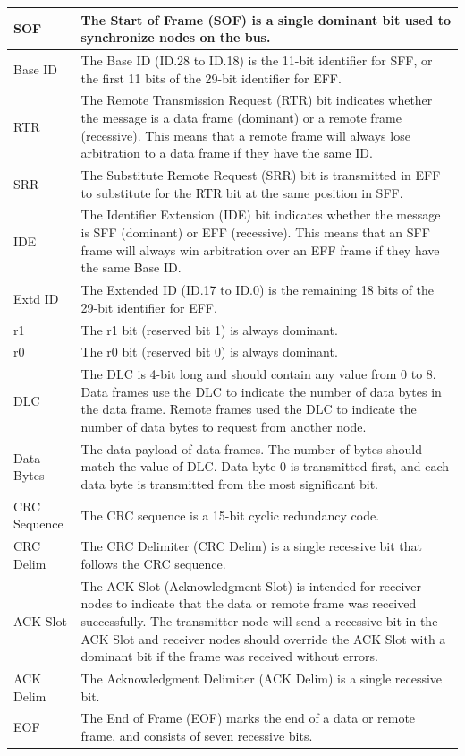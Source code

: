 \begin{longtable}[c]{|p{3.5cm}|p{12cm}|}
    SOF & The Start of Frame (SOF) is a single dominant bit used to synchronize nodes on the bus.
          \\\hline
    Base ID & The Base ID (ID.28 to ID.18) is the 11-bit identifier for SFF, or the first 11 bits of the 29-bit identifier for EFF.
          \\\hline
    RTR & The Remote Transmission Request (RTR) bit indicates whether the message is a data frame (dominant) or a remote frame (recessive). This means that a remote frame will always lose arbitration to a data frame if they have the same ID.                                                    \\\hline
    SRR & The Substitute Remote Request (SRR) bit is transmitted in EFF to substitute for the RTR bit at the same position in SFF.                       
           \\\hline
    IDE & The Identifier Extension (IDE) bit indicates whether the message is SFF (dominant) or EFF (recessive). This means that an SFF frame will always win arbitration over an EFF frame if they have the same Base ID.
            \\\hline
    Extd ID & The Extended ID (ID.17 to ID.0) is the remaining 18 bits of the 29-bit identifier for EFF.
            \\\hline
    r1 & The r1 bit (reserved bit 1) is always dominant.
             \\\hline 
    r0 & The r0 bit (reserved bit 0) is always dominant.
             \\\hline
    DLC & The DLC is 4-bit long and should contain any value from 0 to 8. Data frames use the DLC to indicate the number of data bytes in the data frame. Remote frames used the DLC to indicate the number of data bytes to request from another node. 
             \\\hline
    Data Bytes & The data payload of data frames. The number of bytes should match the value of DLC. Data byte 0 is transmitted first, and each data byte is transmitted from the most significant bit.
             \\\hline
    CRC Sequence & The CRC sequence is a 15-bit cyclic redundancy code.
             \\\hline
    CRC Delim & The CRC Delimiter (CRC Delim) is a single recessive bit that follows the CRC sequence.
              \\\hline
    ACK Slot & The ACK Slot (Acknowledgment Slot) is intended for receiver nodes to indicate that the data or remote frame was received successfully. The transmitter node will send a recessive bit in the ACK Slot and receiver nodes should override the ACK Slot with a dominant bit if the frame was received without errors.
              \\\hline
    ACK Delim & The Acknowledgment Delimiter (ACK Delim) is a single recessive bit.
              \\\hline
    EOF & The End of Frame (EOF) marks the end of a data or remote frame, and consists of seven recessive bits.
              \\\hline
\end{longtable}
